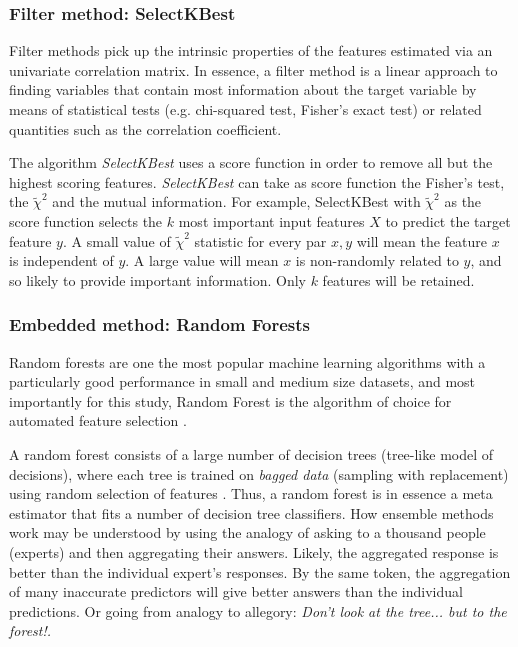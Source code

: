 \documentclass[preprint,12pt]{elsarticle}
\begin{document}
\subsubsection{Filter method: SelectKBest}
Filter methods pick up the intrinsic properties of the features estimated via an univariate correlation matrix. In essence, a filter method is a linear approach to finding variables that contain most information about the target variable by means of statistical tests (e.g. chi-squared test, Fisher's exact test) or related quantities such as the correlation coefficient.

The algorithm \emph{SelectKBest} \cite{scikit-learn} uses a score function in order to remove all but the highest scoring features. \emph{SelectKBest} can take as score function the Fisher's test, the $\tilde{\chi}^2$ and the mutual information. For example, SelectKBest with $\tilde{\chi}^2$ as the score function selects the $k$ most important input features $X$ to predict the target feature $y$. A small value of $\tilde{\chi}^2$ statistic for every par $x,y$ will mean the feature $x$ is independent of $y$. A large value will mean $x$ is non-randomly related to $y$, and so likely to provide important information. Only $k$ features will be retained.

\subsubsection{Embedded method: Random Forests}

Random forests are one the most popular machine learning algorithms with a particularly good performance in small and medium size datasets, and most importantly for this study, Random Forest is the algorithm of choice for automated feature selection \cite{breiman2001random}. 

A random forest consists of a large number of decision trees (tree-like model of decisions), where each tree is trained on \emph{bagged data} (sampling with replacement) using random selection of features \cite{trevor2009elements}. Thus, a random forest is in essence a meta estimator that fits a number of decision tree classifiers. How ensemble methods work may be understood by using the analogy of asking to a thousand people (experts) and then aggregating their answers. Likely, the aggregated response is better than the individual expert’s responses. By the same token, the aggregation of many inaccurate predictors will give better answers than the individual predictions. Or going from analogy to allegory: \emph{Don’t look at the tree... but to the forest!.}
\end{document}
